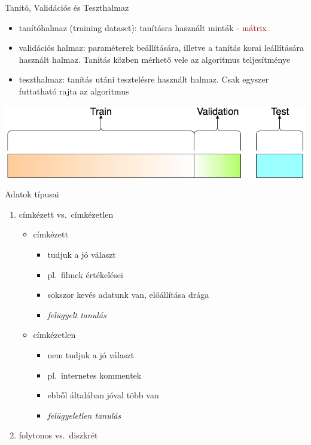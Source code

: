 \documentclass[bigger]{beamer}
\begin{document}
\begin{frame}{Tanitó, Validációs és Teszthalmaz}
\begin{itemize}
        \item tanítóhalmaz (training dataset): tanításra használt minták - \textcolor{darkred}{mátrix}
		\item validációs halmaz: paraméterek beállítására, illetve a tanítás korai leállítására használt halmaz. Tanitás közben mérhető vele az algoritmus teljesítménye
		\item teszthalmaz: tanítás utáni tesztelésre használt halmaz. Csak egyszer futtatható rajta az algoritmus
	\end{itemize}
\centering
\includegraphics[width=.8\textwidth]{fig/train}
\end{frame}

\begin{frame}{Adatok típusai}
    \begin{enumerate}
        \item címkézett vs.~címkézetlen
            \begin{itemize}
                \item címkézett
                    \begin{itemize}
                        \item tudjuk a jó választ
                        \item pl.~filmek értékelései
                        \item sokszor kevés adatunk van, előállítása drága
                        \item \emph{felügyelt tanulás}
                    \end{itemize}
                \item címkézetlen
                    \begin{itemize}
                        \item nem tudjuk a jó választ
                        \item pl.~internetes kommentek
                        \item ebből általában jóval több van
                        \item \emph{felügyeletlen tanulás}
                    \end{itemize}
            \end{itemize}
        \item folytonos vs.~diszkrét
    \end{enumerate}
\end{frame}
\end{document}
